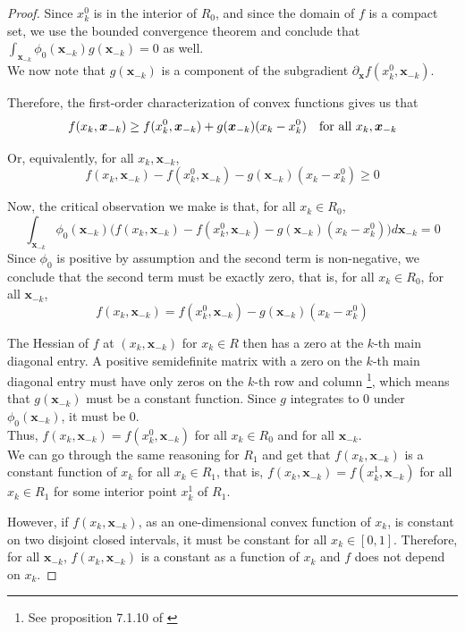 \begin{proof}
Since $x^0_k$ is in the interior of $R_0$, and since the domain of $f$ is a compact set, we use the bounded convergence theorem and conclude that $\int_{\mathbf{x}_{-k}} \phi_0( \mathbf{x}_{-k}) g(\mathbf{x}_{-k}) = 0$ as well.\\

We now note that $g(\mathbf{x}_{-k})$ is a component of the subgradient 
$\partial_{\mathbf{x}} f(x^0_k, \mathbf{x}_{-k})$. 

Therefore, the first-order characterization of convex functions gives us that
\begin{align*}
f(x_k, \mbox{\boldmath $x$}_{-k}) \geq f(x^0_k, \mbox{\boldmath $x$}_{-k}) + g(\mbox{\boldmath $x$}_{-k}) (x_k - x^0_k)
   \quad \textrm{for all } x_k, \mbox{\boldmath $x$}_{-k}
\end{align*}

Or, equivalently, for all $x_k, \mathbf{x}_{-k}$, 
\[
f(x_k, \mathbf{x}_{-k}) - f(x^0_k, \mathbf{x}_{-k}) - g(\mathbf{x}_{-k}) (x_k-x^0_k) \geq 0
\]

Now, the critical observation we make is that, for all $x_k \in R_0$, 
\[
\int_{\mathbf{x}_{-k}} \phi_0(\mathbf{x}_{-k}) 
     \Big(f(x_k, \mathbf{x}_{-k}) - f(x^0_k, \mathbf{x}_{-k}) 
     - g(\mathbf{x}_{-k}) (x_k - x^0_k) \Big) d\mathbf{x}_{-k} = 0
\]
Since $\phi_0$ is positive by assumption and the second term is non-negative, we conclude that the second term must be exactly zero, that is, for all $x_k \in R_0$, for all $\mathbf{x}_{-k}$, 
$$
f(x_k, \mathbf{x}_{-k}) = f(x^0_k, \mathbf{x}_{-k}) - g(\mathbf{x}_{-k}) (x_k - x^0_k)
$$

The Hessian of $f$ at $(x_k, \mathbf{x}_{-k})$ for $x_k \in R$ then has a zero at the $k$-th main diagonal entry. A positive semidefinite matrix with a zero on the $k$-th main diagonal entry must have only zeros on the $k$-th row and column \footnote{ See proposition 7.1.10 of \citet{HJ90}}, which means that $g(\mathbf{x}_{-k})$ must be a constant function. Since $g$ integrates to 0 under $\phi_0(\mathbf{x}_{-k})$, it must be 0.\\

Thus, $f(x_k, \mathbf{x}_{-k}) = f(x^0_k, \mathbf{x}_{-k})$ for all $x_k \in R_0$ and for all $\mathbf{x}_{-k}$.\\

We can go through the same reasoning for $R_1$  and get that $f(x_k, \mathbf{x}_{-k})$ is a constant function of $x_k$ for all $x_k \in R_1$, that is, $f(x_k, \mathbf{x}_{-k}) = f(x^1_k, \mathbf{x}_{-k})$ for all $x_k \in R_1$ for some interior point $x^1_k$ of $R_1$.

However, if $f(x_k, \mathbf{x}_{-k})$, as an one-dimensional convex function of $x_k$, is constant on two disjoint closed intervals, it must be constant for all $x_k \in [0,1]$. Therefore, for all $\mathbf{x}_{-k}$, $f(x_k, \mathbf{x}_{-k})$ is a constant as a function of $x_k$ and $f$ does not depend on $x_k$.

\end{proof}

